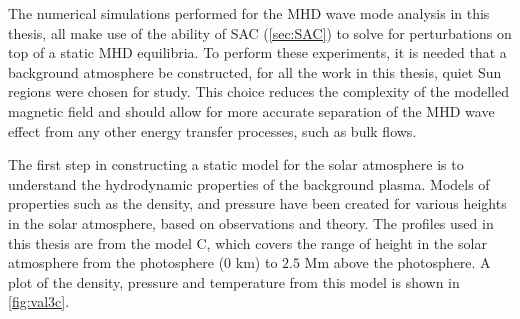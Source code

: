 The numerical simulations performed for the MHD wave mode analysis in this thesis, all make use of the ability of SAC (\cref{sec:SAC}) to solve for perturbations on top of a static MHD equilibria.
To perform these experiments, it is needed that a background atmosphere be constructed, for all the work in this thesis, quiet Sun regions were chosen for study.
This choice reduces the complexity of the modelled magnetic field and should allow for more accurate separation of the MHD wave effect from any other energy transfer processes, such as bulk flows.

The first step in constructing a static model for the solar atmosphere is to understand the hydrodynamic properties of the background plasma.
Models of properties such as the density, and pressure have been created for various heights in the solar atmosphere, based on observations and theory.
The profiles used in this thesis are from the \cite{vernazza1981} model C, which covers the range of height in the solar atmosphere from the photosphere ($0$ km) to $2.5$ Mm above the photosphere.
A plot of the density, pressure and temperature from this model is shown in \cref{fig:val3c}.

